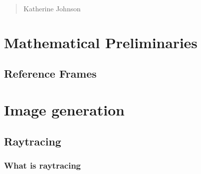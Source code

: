 \begin{quotation}
{\footnotesize
{}
\begin{flushright}
Katherine Johnson
\end{flushright}
}
\end{quotation}
\vspace{0.5cm}

\section{Mathematical Preliminaries}

\subsection{Reference Frames}

\section{Image generation}

\subsection{Raytracing}

\subsubsection{What is raytracing}

